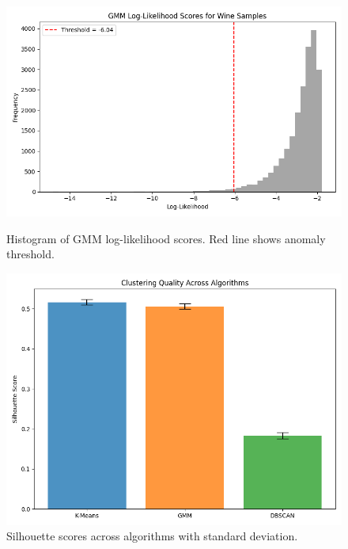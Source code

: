 \documentclass[12pt]{article}
\begin{document}
\begin{figure}[H]
    \centering
    \begin{minipage}[t]{0.48\textwidth}
        \includegraphics[width=\textwidth]{figures/gmm_anomaly_score_hist.png}
        \caption{Histogram of GMM log-likelihood scores. Red line shows anomaly threshold.}
        \label{H}
    \end{minipage}
    \hfill
    \begin{minipage}[t]{0.48\textwidth}
        \includegraphics[width=\textwidth]{figures/silhouette_barplot.png}
        \caption{Silhouette scores across algorithms with standard deviation.}
        \label{J}
    \end{minipage}
\end{figure}
\end{document}
